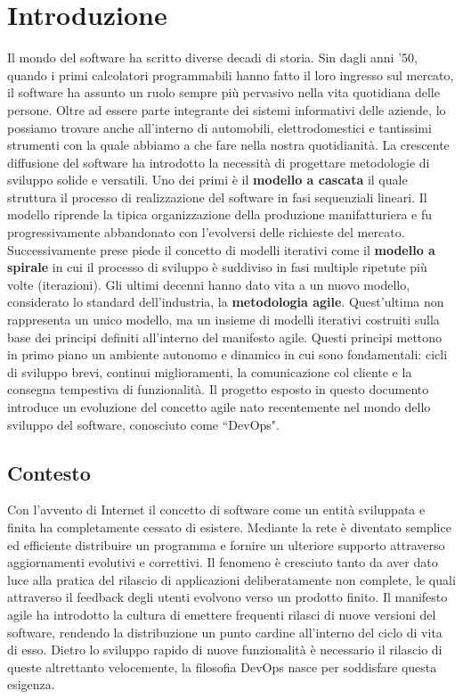 
\chapter{Introduzione}\label{chap:introduction}
Il mondo del software ha scritto diverse decadi di storia. Sin dagli anni '50, quando i primi calcolatori programmabili hanno fatto il loro ingresso sul mercato, il software ha assunto un ruolo sempre più pervasivo nella vita quotidiana delle persone. Oltre ad essere parte integrante dei sistemi informativi delle aziende, lo possiamo trovare anche all'interno di automobili, elettrodomestici e tantissimi strumenti con la quale abbiamo a che fare nella nostra quotidianità. La crescente diffusione del software ha introdotto la necessità di progettare metodologie di sviluppo solide e versatili. Uno dei primi è il \textbf{modello a cascata} il quale struttura il processo di realizzazione del software in fasi sequenziali lineari. Il modello riprende la tipica organizzazione della produzione manifatturiera e fu progressivamente abbandonato con l'evolversi delle richieste del mercato. Successivamente prese piede il concetto di modelli iterativi come il \textbf{modello a spirale} in cui il processo di sviluppo è suddiviso in fasi multiple ripetute più volte (iterazioni). Gli ultimi decenni hanno dato vita a un nuovo modello, considerato lo standard dell'industria, la \textbf{metodologia agile}. Quest'ultima non rappresenta un unico modello, ma un insieme di modelli iterativi costruiti sulla base dei principi definiti all'interno del manifesto agile. Questi principi mettono in primo piano un ambiente autonomo e dinamico in cui sono fondamentali: cicli di sviluppo brevi, continui miglioramenti, la comunicazione col cliente e la consegna tempestiva di funzionalità. Il progetto esposto in questo documento introduce un evoluzione del concetto agile nato recentemente nel mondo dello sviluppo del software, conosciuto come ``DevOps".

\section{Contesto}
Con l'avvento di Internet il concetto di software come un entità sviluppata e finita ha completamente cessato di esistere. Mediante la rete è diventato semplice ed efficiente distribuire un programma e fornire un ulteriore supporto attraverso aggiornamenti evolutivi e correttivi. Il fenomeno è cresciuto tanto da aver dato luce alla pratica del rilascio di applicazioni deliberatamente non complete, le quali attraverso il feedback degli utenti evolvono verso un prodotto finito. Il manifesto agile ha introdotto la cultura di emettere frequenti rilasci di nuove versioni del software, rendendo la distribuzione un punto cardine all'interno del ciclo di vita di esso. Dietro lo sviluppo rapido di nuove funzionalità è necessario il rilascio di queste altrettanto velocemente, la filosofia DevOps nasce per soddisfare questa esigenza.


